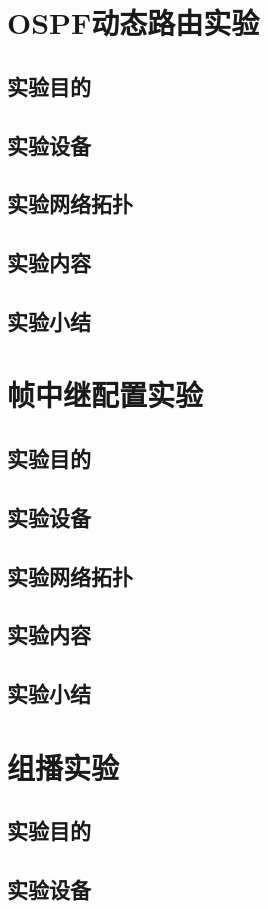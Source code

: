 \documentclass[lang=cn,11pt,a4paper,cite=authoryear]{elegantpaper}
\begin{document}
\section{OSPF动态路由实验}
\subsection{实验目的}
\subsection{实验设备}
\subsection{实验网络拓扑}
\subsection{实验内容}
\subsection{实验小结}
\section{帧中继配置实验}
\subsection{实验目的}
\subsection{实验设备}
\subsection{实验网络拓扑}
\subsection{实验内容}
\subsection{实验小结}
\section{组播实验}
\subsection{实验目的}
\subsection{实验设备}
\end{document}
